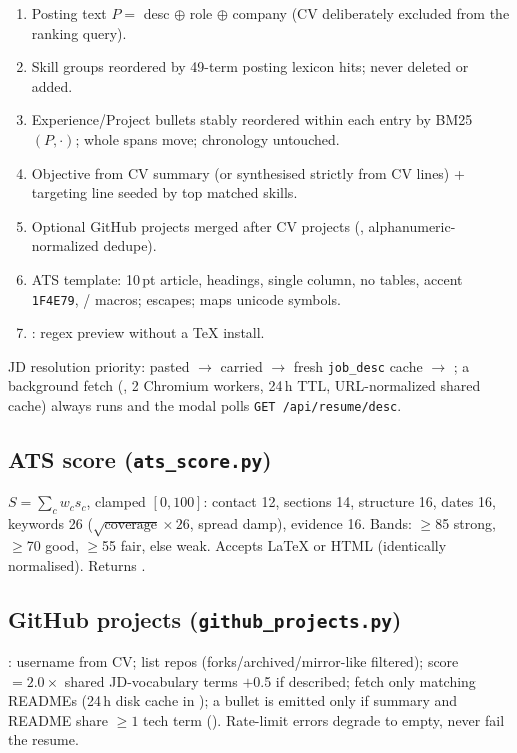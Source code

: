 \documentclass[11pt,a4paper]{article}
\newcommand{\file}[1]{\texttt{\small #1}}
\newcommand{\api}[2]{\texttt{\small #1\,#2}}
\begin{document}
\begin{enumerate}[leftmargin=2.2em]
  \item Posting text $P=$ desc $\oplus$ role $\oplus$ company (CV
        deliberately excluded from the ranking query).
  \item Skill groups reordered by 49-term posting lexicon hits; never
        deleted or added.
  \item Experience/Project bullets stably reordered within each entry by
        BM25$(P,\cdot)$; whole spans move; chronology untouched.
  \item Objective from CV summary (or synthesised strictly from CV lines)
        + targeting line seeded by top matched skills.
  \item Optional GitHub projects merged after CV projects
        (, alphanumeric-normalized
        dedupe).
  \item ATS template: 10\,pt article, 
        headings, single column, no tables, accent \texttt{1F4E79},
        /
        macros;  escapes;  maps unicode
        symbols.
  \item {}: regex preview without a TeX install.
\end{enumerate}

JD resolution priority: pasted $\rightarrow$ carried $\rightarrow$ fresh
\file{job\_desc} cache $\rightarrow$ ; a
background fetch (, 2 Chromium workers, 24\,h TTL,
URL-normalized shared cache) always runs and the modal polls
\api{GET}{/api/resume/desc}.

\subsection{ATS score (\file{ats\_score.py})}
$S=\sum_c w_c s_c$, clamped $[0,100]$: contact 12, sections 14, structure
16, dates 16, keywords 26 ($\sqrt{\text{coverage}}\times 26$, spread
damp), evidence 16. Bands: $\geq$85 strong, $\geq$70 good, $\geq$55 fair,
else weak. Accepts \LaTeX{} or HTML (identically normalised). Returns
.

\subsection{GitHub projects (\file{github\_projects.py})}
:
username from CV; list repos (forks/archived/mirror-like filtered); score
$=2.0\times$ shared JD-vocabulary terms $+$0.5 if described; fetch only
matching READMEs (24\,h disk cache in ); a bullet is
emitted only if summary and README share $\geq1$ tech term
(). Rate-limit errors degrade to empty, never fail the
resume.
\end{document}

